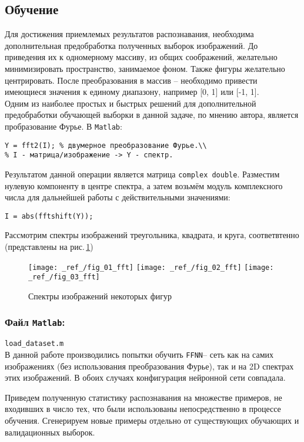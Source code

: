 \documentclass[12pt,a4paper]{article}
\newcommand{\ffnn}{\texttt{FFNN}}
\begin{document}
\subsection*{Обучение}
Для достижения приемлемых результатов распознавания, необходима дополнительная предобработка полученных выборок изображений. До приведения их к одномерному массиву, из общих соображений, желательно минимизировать пространство, занимаемое фоном. Также фигуры желательно центрировать. После преобразования в массив -- необходимо привести имеющиеся значения к единому диапазону, например [0, 1] или [-1, 1].\\
Одним из наиболее простых и быстрых решений для дополнительной предобработки обучающей выборки в данной задаче, по мнению автора, является пробразование Фурье. В \texttt{Matlab}:
\begin{verbatim}
Y = fft2(I); % двумерное преобразование Фурье.\\
% I - матрица/изображение -> Y - спектр.
\end{verbatim}
Результатом данной операции является матрица \texttt{complex double}. Разместим нулевую компоненту в центре спектра, а затем возьмём модуль комплексного числа для дальнейшей работы с действительными значениями:
\begin{verbatim}
I = abs(fftshift(Y));
\end{verbatim}
Рассмотрим спектры изображений треугольника, квадрата, и круга, соответвтенно (представлены на рис.\,\ref{fig:figs_fft})
\begin{figure}[H]
	\centering
	\texttt{[image: \_ref\_/fig\_01\_fft]}	
	\texttt{[image: \_ref\_/fig\_02\_fft]}
	\texttt{[image: \_ref\_/fig\_03\_fft]}	
	\caption{Спектры изображений некоторых фигур}
	\label{fig:figs_fft}
\end{figure}

\subsubsection*{Файл \texttt{Matlab}:}
\verb|load_dataset.m|\\

В данной работе производились попытки обучить \ffnn -- сеть как на 
самих изображениях (без использования преобразования Фурье), так и на 
2D спектрах этих изображений. В обоих случаях конфигурация 
нейронной сети совпадала.

Приведем полученную статистику распознавания на множестве примеров, не входивших в число тех, что были использованы непосредственно в процессе обучения. Сгенерируем новые примеры отдельно от существующих обучающих и валидационных выборок.
\end{document}
